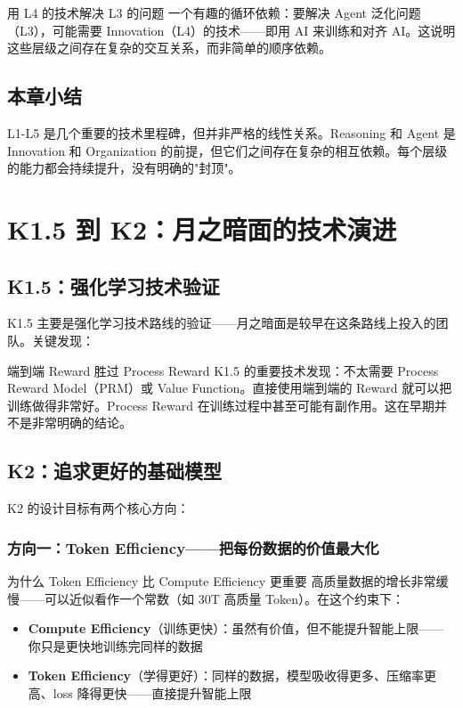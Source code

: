 \documentclass[a4paper]{article}
\begin{document}
\begin{knowledgebox}{用 L4 的技术解决 L3 的问题}
一个有趣的循环依赖：要解决 Agent 泛化问题（L3），可能需要 Innovation（L4）的技术——即用 AI 来训练和对齐 AI。这说明这些层级之间存在复杂的交互关系，而非简单的顺序依赖。
\end{knowledgebox}

\subsection{本章小结}

L1-L5 是几个重要的技术里程碑，但并非严格的线性关系。Reasoning 和 Agent 是 Innovation 和 Organization 的前提，但它们之间存在复杂的相互依赖。每个层级的能力都会持续提升，没有明确的"封顶"。


\section{K1.5 到 K2：月之暗面的技术演进}

\subsection{K1.5：强化学习技术验证}

K1.5 主要是强化学习技术路线的验证——月之暗面是较早在这条路线上投入的团队。关键发现：

\begin{importantbox}{端到端 Reward 胜过 Process Reward}
K1.5 的重要技术发现：不太需要 Process Reward Model（PRM）或 Value Function。直接使用端到端的 Reward 就可以把训练做得非常好。Process Reward 在训练过程中甚至可能有副作用。这在早期并不是非常明确的结论。
\end{importantbox}

\subsection{K2：追求更好的基础模型}

K2 的设计目标有两个核心方向：

\subsubsection{方向一：Token Efficiency——把每份数据的价值最大化}

\begin{importantbox}{为什么 Token Efficiency 比 Compute Efficiency 更重要}
高质量数据的增长非常缓慢——可以近似看作一个常数（如 30T 高质量 Token）。在这个约束下：
\begin{itemize}
    \item \textbf{Compute Efficiency}（训练更快）：虽然有价值，但不能提升智能上限——你只是更快地训练完同样的数据
    \item \textbf{Token Efficiency}（学得更好）：同样的数据，模型吸收得更多、压缩率更高、loss 降得更快——直接提升智能上限
\end{itemize}
\end{importantbox}
\end{document}
